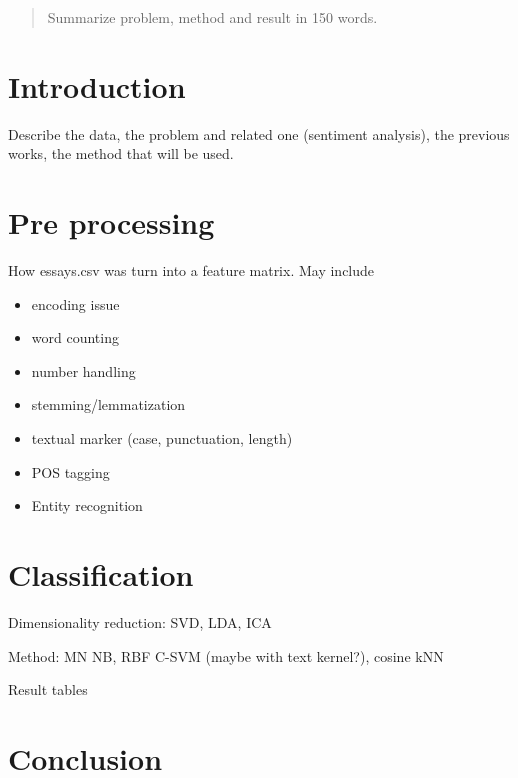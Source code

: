 \begin{abstract}
	Summarize problem, method and result in 150 words.
\end{abstract}

\section{Introduction}
Describe the data, the problem and related one (sentiment analysis), the
previous works\cite{mairesse2007perso}, the method that will be used.

\section{Pre processing}
How essays.csv was turn into a feature matrix. May include
\begin{itemize}
\item encoding issue
\item word counting
\item number handling
\item stemming/lemmatization \autocite{bird2009nltk}
\item textual marker (case, punctuation, length)
\item POS tagging
\item Entity recognition
\end{itemize}

\section{Classification}
Dimensionality reduction: SVD, LDA, ICA

Method: MN NB, RBF C-SVM (maybe with text kernel?), cosine kNN

Result tables

\section{Conclusion}
